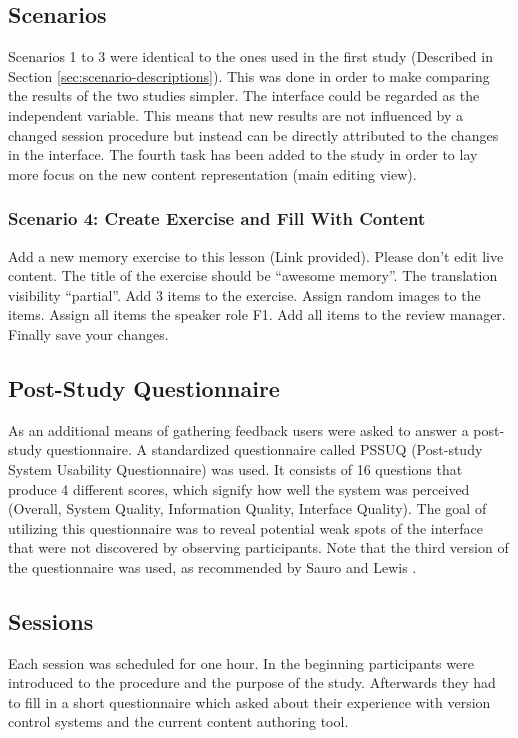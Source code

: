 \subsection{Scenarios}
Scenarios 1 to 3 were identical to the ones used in the first study (Described in Section \ref{sec:scenario-descriptions}). This was done in order to make comparing the results of the two studies simpler. The interface could be regarded as the independent variable. This means that new results are not influenced by a changed session procedure but instead can be directly attributed to the changes in the interface. The fourth task has been added to the study in order to lay more focus on the new content representation (main editing view).

\subsubsection{Scenario 4: Create Exercise and Fill With Content} Add a new memory exercise to this lesson (Link provided). Please don’t edit live content. The title of the exercise should be “awesome memory”. The translation visibility “partial”. Add 3 items to the exercise. Assign random images to the items. Assign all items the speaker role F1. Add all items to the review manager. Finally save your changes.

\subsection{Post-Study Questionnaire}
As an additional means of gathering feedback users were asked to answer a post-study questionnaire. A standardized questionnaire called PSSUQ (Post-study System Usability Questionnaire) was used. It consists of 16 questions that produce 4 different scores, which signify how well the system was perceived (Overall, System Quality, Information Quality, Interface Quality). The goal of utilizing this questionnaire was to reveal potential weak spots of the interface that were not discovered by observing participants. Note that the third version of the questionnaire was used, as recommended by Sauro and Lewis \cite{sauro_quantifying_2012}.

\subsection{Sessions}
Each session was scheduled for one hour. In the beginning participants were introduced to the procedure and the purpose of the study. Afterwards they had to fill in a short questionnaire which asked about their experience with version control systems and the current content authoring tool.

